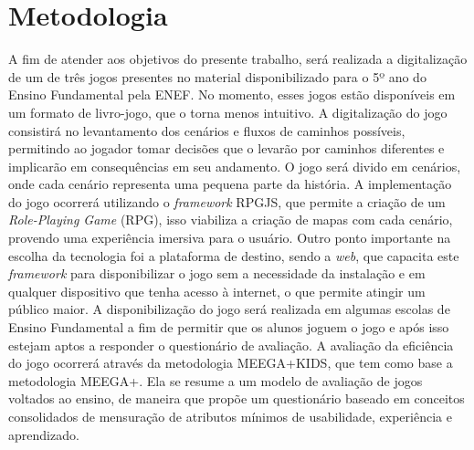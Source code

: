 \section{Metodologia}
A fim de atender aos objetivos do presente trabalho, será realizada a digitalização de um de três jogos presentes no material disponibilizado para o 5º ano do Ensino Fundamental pela ENEF. No momento, esses jogos estão disponíveis em um formato de livro-jogo, que o torna menos intuitivo. A digitalização do jogo consistirá no levantamento dos cenários e fluxos de caminhos possíveis, permitindo ao jogador tomar decisões que o levarão por caminhos diferentes e implicarão em consequências em seu andamento. O jogo será divido em cenários, onde cada cenário representa uma pequena parte da história.
A implementação do jogo ocorrerá utilizando o \textit{framework} RPGJS, que permite a criação de um \textit{Role-Playing Game} (RPG), isso viabiliza a criação de mapas com cada cenário, provendo uma experiência imersiva para o usuário. Outro ponto importante na escolha da tecnologia foi a plataforma de destino, sendo a \textit{web}, que capacita este \textit{framework} para disponibilizar o jogo sem a necessidade da instalação e em qualquer dispositivo que tenha acesso à internet, o que permite atingir um público maior.
A disponibilização do jogo será realizada em algumas escolas de Ensino Fundamental a fim de permitir que os alunos joguem o jogo e após isso estejam aptos a responder o questionário de avaliação.
A avaliação da eficiência do jogo ocorrerá através da metodologia MEEGA+KIDS\cite{GresseVonWangenheim2020}, que tem como base a metodologia MEEGA+\cite{petri2019meega+}. Ela se resume a um modelo de avaliação de jogos voltados ao ensino, de maneira que propõe um questionário baseado em conceitos consolidados de mensuração de atributos mínimos de usabilidade, experiência e aprendizado.